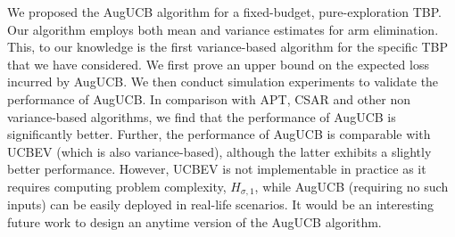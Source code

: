 We proposed the AugUCB algorithm for a fixed-budget, pure-exploration TBP. Our algorithm employs both mean and variance estimates for arm elimination. This, to our knowledge is the first variance-based algorithm for the specific TBP that we have considered. We first prove an upper bound on the expected loss incurred by AugUCB. We then conduct simulation experiments to validate the performance of AugUCB. In comparison with APT, CSAR and other non variance-based algorithms, we find that the performance of AugUCB is significantly better. Further, the performance of AugUCB is comparable with UCBEV (which is also variance-based), although the latter exhibits a slightly better performance.  However, UCBEV is not implementable in practice as it requires computing problem complexity, $H_{\sigma,1}$, while AugUCB (requiring no such inputs) can be easily deployed in real-life scenarios. It would be an interesting future work to design an anytime version of the AugUCB algorithm. 


